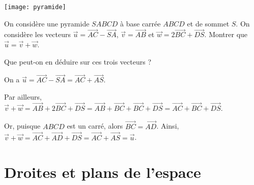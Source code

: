 \documentclass[11pt,fleqn, openany]{book} %
\begin{document}
\begin{exercise}
\hspace{0pt}
\begin{minipage}{0.3\linewidth}
 \begin{center}
\texttt{[image: pyramide]}
\end{center}
\end{minipage}\hfill\begin{minipage}{0.6\linewidth}

On considère une pyramide $SABCD$ à base carrée $ABCD$ et de sommet $S$. 
\vskip5pt
On considère les vecteurs $\vec u = \overrightarrow{AC}-\overrightarrow{SA}$, $\vec v = \overrightarrow{AB}$ et $\vec w = 2\overrightarrow{BC} + \overrightarrow{DS}$. Montrer que $\vec u = \vec v + \vec w$.

Que peut-on en déduire sur ces trois vecteurs ?\end{minipage}\end{exercise}

\begin{solution}
On a $\vec u = \overrightarrow{AC}-\overrightarrow{SA}=\overrightarrow{AC}+\overrightarrow{AS}$.

Par ailleurs, $\vec v + \vec w=\overrightarrow{AB} + 2\overrightarrow{BC} + \overrightarrow{DS}=\overrightarrow{AB} + \overrightarrow{BC} + \overrightarrow{BC}+\overrightarrow{DS}=\overrightarrow{AC}+\overrightarrow{BC}+\overrightarrow{DS}$.

Or, puisque $ABCD$ est un carré, alors $\overrightarrow{BC}=\overrightarrow{AD}$. Ainsi, $\vec v + \vec w = \overrightarrow{AC}+\overrightarrow{AD}+\overrightarrow{DS}=\overrightarrow{AC}
+\overrightarrow{AS}=\vec u$.\end{solution}



\section*{Droites et plans de l'espace}
\end{document}
